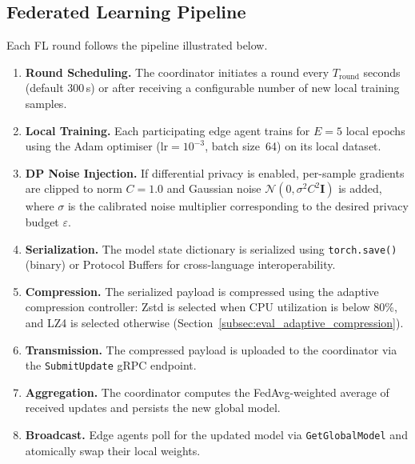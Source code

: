 \subsection{Federated Learning Pipeline}
\label{subsec:design_fl_pipeline}

Each FL round follows the pipeline illustrated below.

\begin{enumerate}
    \item \textbf{Round Scheduling.} The coordinator initiates a round every
    $T_{\text{round}}$ seconds (default 300\,s) or after receiving a
    configurable number of new local training samples.

    \item \textbf{Local Training.} Each participating edge agent trains for
    $E=5$ local epochs using the Adam optimiser ($\text{lr}=10^{-3}$,
    batch size~64) on its local dataset.

    \item \textbf{DP Noise Injection.} If differential privacy is enabled,
    per-sample gradients are clipped to norm $C=1.0$ and Gaussian noise
    $\mathcal{N}(0, \sigma^2 C^2\mathbf{I})$ is added, where
    $\sigma$ is the calibrated noise multiplier corresponding to the
    desired privacy budget $\varepsilon$.

    \item \textbf{Serialization.} The model state dictionary is serialized
    using \texttt{torch.save()} (binary) or Protocol Buffers for
    cross-language interoperability.

    \item \textbf{Compression.} The serialized payload is compressed using the
    adaptive compression controller: Zstd is selected when CPU utilization is
    below 80\%, and LZ4 is selected otherwise
    (Section~\ref{subsec:eval_adaptive_compression}).

    \item \textbf{Transmission.} The compressed payload is uploaded to the
    coordinator via the \texttt{SubmitUpdate} gRPC endpoint.

    \item \textbf{Aggregation.} The coordinator computes the FedAvg-weighted
    average of received updates and persists the new global model.

    \item \textbf{Broadcast.} Edge agents poll for the updated model via
    \texttt{GetGlobalModel} and atomically swap their local weights.
\end{enumerate}

